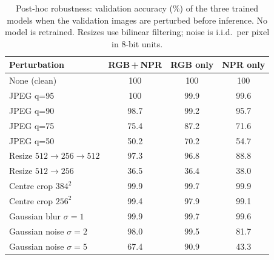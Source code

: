 \begin{table}[t]
  \centering\small
  \setlength{\tabcolsep}{4pt}
  \begin{tabular}{@{}lccc@{}}
    \toprule
    Perturbation & RGB\,+\,NPR & RGB only & NPR only \\
    \midrule
    None (clean) & 100 & 100 & 100 \\
    JPEG q=95 & 100 & 99.9 & 99.6 \\
    JPEG q=90 & 98.7 & 99.2 & 95.7 \\
    JPEG q=75 & 75.4 & 87.2 & 71.6 \\
    JPEG q=50 & 50.2 & 70.2 & 54.7 \\
    Resize $512{\to}256{\to}512$ & 97.3 & 96.8 & 88.8 \\
    Resize $512{\to}256$ & 36.5 & 36.4 & 38.0 \\
    Centre crop $384^2$ & 99.9 & 99.7 & 99.9 \\
    Centre crop $256^2$ & 99.4 & 97.9 & 99.1 \\
    Gaussian blur $\sigma{=}1$ & 99.9 & 99.7 & 99.6 \\
    Gaussian noise $\sigma{=}2$ & 98.0 & 99.5 & 81.7 \\
    Gaussian noise $\sigma{=}5$ & 67.4 & 90.9 & 43.3 \\
    \bottomrule
  \end{tabular}
  \caption{Post-hoc robustness: validation accuracy (\%) of the three trained models when the validation images are perturbed before inference. No model is retrained. Resizes use bilinear filtering; noise is i.i.d.\ per pixel in 8-bit units.}
  \label{tab:robust}
\end{table}
